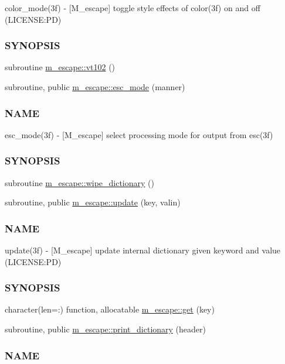 \begin{DoxyCompactItemize}
\begin{DoxyCompactList}
color\+\_\+mode(3f) -\/ \mbox{[}M\+\_\+escape\mbox{]} toggle style effects of color(3f) on and off (L\+I\+C\+E\+N\+SE\+:PD) \subsubsection*{S\+Y\+N\+O\+P\+S\+IS}\end{DoxyCompactList}\item 
subroutine \mbox{\hyperlink{namespacem__escape_ae9d40717b2e75e90e2505d5fed6435c5}{m\+\_\+escape\+::vt102}} ()
\item 
subroutine, public \mbox{\hyperlink{namespacem__escape_a4210456d81d9a1bf328093a9635e640b}{m\+\_\+escape\+::esc\+\_\+mode}} (manner)
\begin{DoxyCompactList}\small\item\em \subsubsection*{N\+A\+ME}

esc\+\_\+mode(3f) -\/ \mbox{[}M\+\_\+escape\mbox{]} select processing mode for output from esc(3f) \subsubsection*{S\+Y\+N\+O\+P\+S\+IS}\end{DoxyCompactList}\item 
subroutine \mbox{\hyperlink{namespacem__escape_a1bc574bc97157fe67d868d2bd180c91e}{m\+\_\+escape\+::wipe\+\_\+dictionary}} ()
\item 
subroutine, public \mbox{\hyperlink{namespacem__escape_a5efd612f60d281003917329484a7960c}{m\+\_\+escape\+::update}} (key, valin)
\begin{DoxyCompactList}\small\item\em \subsubsection*{N\+A\+ME}

update(3f) -\/ \mbox{[}M\+\_\+escape\mbox{]} update internal dictionary given keyword and value (L\+I\+C\+E\+N\+SE\+:PD) \subsubsection*{S\+Y\+N\+O\+P\+S\+IS}\end{DoxyCompactList}\item 
character(len=\+:) function, allocatable \mbox{\hyperlink{namespacem__escape_af555c90c278ff964d8bce93ee0368a42}{m\+\_\+escape\+::get}} (key)
\item 
subroutine, public \mbox{\hyperlink{namespacem__escape_a6add907828fd34e94b87f643a5cabc64}{m\+\_\+escape\+::print\+\_\+dictionary}} (header)
\begin{DoxyCompactList}\small\item\em \subsubsection*{N\+A\+ME}


\end{DoxyCompactList}
\end{DoxyCompactItemize}
